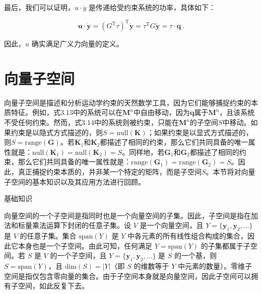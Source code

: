 \documentclass[10pt,a4paper]{book}
\theoremstyle{thmstyle} %
\theoremstyle{defstyle} %
\theoremstyle{prostyle} %
\begin{document}
最后，我们可以证明，$u \cdot \dot{y}$ 是传递给受约束系统的功率，具体如下：



$$
\boldsymbol { u } \cdot \dot { \boldsymbol { y } } = ( G ^{\mathrm { T} } \tau ) ^{\mathrm { T} } \dot { \boldsymbol { y } } = \tau ^{\mathrm { T} } G \dot { \boldsymbol { y } } = \tau \cdot \dot { \boldsymbol { q } } \, .
$$



因此，$u$ 确实满足广义力向量的定义。



\section{向量子空间}





向量子空间是描述和分析运动学约束的天然数学工具，因为它们能够捕捉约束的本质特征。例如，式3.13中的系统可以在$\mathbf{M}^{n}$中自由移动，因为$\dot{\mathbf{q}}$属于$\mathbf{M}^{n}$，且该系统不受任何约束。然而，式3.14中的系统则被约束，只能在$\mathbf{M}^{n}$的子空间$S$中移动。如果约束是以隐式方式描述的，则$S = \text{null}(\mathbf{K})$；如果约束是以显式方式描述的，则$S = \text{range}(\mathbf{G})$。若$\mathbf{K}_{1}$和$\mathbf{K}_{2}$都描述了相同的约束，那么它们共同具备的唯一属性就是：$\text{null}(\mathbf{K}_{1}) = \text{null}(\mathbf{K}_{2}) = S$。同样地，若$\mathbf{G}_{1}$和$\mathbf{G}_{2}$都描述了相同的约束，那么它们共同具备的唯一属性就是：$\text{range}(\mathbf{G}_{1}) = \text{range}(\mathbf{G}_{2}) = S$。因此，真正捕捉约束本质的，并非某一个特定的矩阵，而是子空间$S$。本节将对向量子空间的基本知识以及其应用方法进行回顾。



基础知识



向量空间的一个子空间是指同时也是一个向量空间的子集。因此，子空间是指在加法和标量乘法运算下封闭的任意子集。设 $V$ 是一个向量空间，且 $Y = \{\mathbf{y}_1, \mathbf{y}_2, \ldots\}$ 是 $V$ 的任意子集。集合 $\text{span}(Y)$ 是 $Y$ 中各元素的所有线性组合构成的集合，因此它本身也是一个子空间。由此可知，任何满足 $Y = \text{span}(Y)$ 的子集都属于子空间。若 $S$ 是 $V$ 的一个子空间，且 $Y = \{\mathbf{y}_1, \mathbf{y}_2, \ldots\}$ 是 $S$ 的一个基，则 $S = \text{span}(Y)$，且 $\text{dim}(S) = |Y|$（即 $S$ 的维数等于 $Y$ 中元素的数量）。零维子空间是指仅包含零向量的集合。由于子空间本身就是向量空间，因此子空间可以拥有子空间，如此反复下去。
\end{document}
